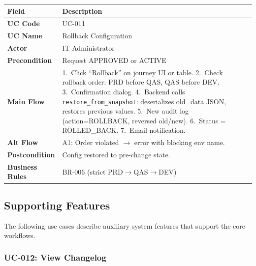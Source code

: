 \documentclass[12pt,a4paper]{report}
\begin{document}
\begin{longtable}{|>{\bfseries}p{2.8cm}|p{12cm}|}
  \hline
  \rowcolor{tableheadpeach}
  \textbf{Field} & \textbf{Description} \\ \hline
  \endhead \hline \endfoot
  UC Code       & UC-011 \\ \hline
  UC Name       & Rollback Configuration \\ \hline
  Actor         & IT Administrator \\ \hline
  Precondition  & Request APPROVED or ACTIVE \\ \hline
  Main Flow     & 1.~Click ``Rollback'' on journey UI or table.
                  2.~Check rollback order: PRD before QAS, QAS before DEV.
                  3.~Confirmation dialog.
                  4.~Backend calls \texttt{restore\_from\_snapshot}: deserializes old\_data JSON, restores previous values.
                  5.~New audit log (action=ROLLBACK, reversed old/new).
                  6.~Status = ROLLED\_BACK.
                  7.~Email notification. \\ \hline
  Alt Flow      & A1: Order violated $\rightarrow$ error with blocking env name. \\ \hline
  Postcondition & Config restored to pre-change state. \\ \hline
  Business Rules& BR-006 (strict PRD$\rightarrow$QAS$\rightarrow$DEV) \\ \hline
\end{longtable}


\subsection{Supporting Features}

The following use cases describe auxiliary system features that support the core workflows.

\subsubsection{UC-012: View Changelog}
\end{document}
